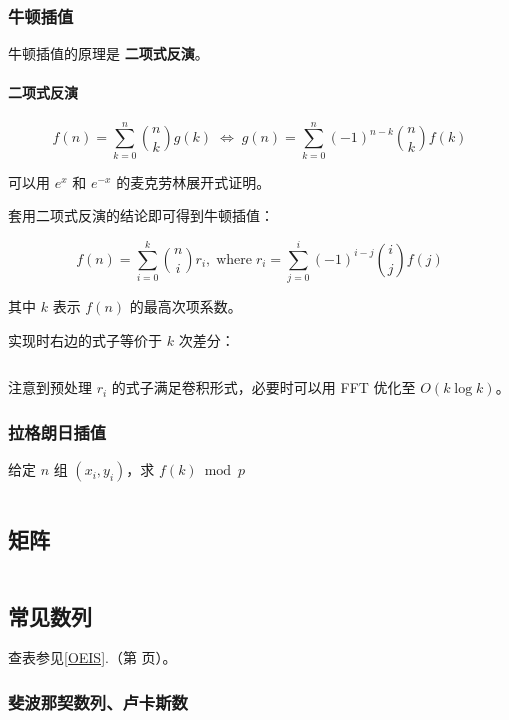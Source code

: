 \documentclass[a4paper, twoside]{article}
\newcommand\detailedref[1]{\ref{#1}.\nameref{#1}（第 \pageref{#1} 页）}
\begin{document}
        \subsubsection{牛顿插值}
        \label{NewtonInterpolation}
        牛顿插值的原理是 \textbf{二项式反演}。

        \paragraph{二项式反演}
        
            $$ f(n) = \sum_{k = 0} ^ n {n \choose k} g(k) \; \iff \; g(n) = \sum_{k = 0} ^ n \left( -1 \right) ^ {n - k} {n \choose k} f(k) $$
        
        可以用 $e^x$ 和 $e^{-x}$ 的麦克劳林展开式证明。
        
        套用二项式反演的结论即可得到牛顿插值：
        
            $$ f(n) = \sum_{i = 0} ^ k {n \choose i} r_i , \; \text{where} \; r_i = \sum_{j = 0} ^ i (-1) ^ {i - j} {i \choose j} f(j) $$
        
        其中 $k$ 表示 $f(n)$ 的最高次项系数。
        
        实现时右边的式子等价于 $k$ 次差分：
        
        \inputminted{cpp}{../src/数学/牛顿插值.cpp}
        
        注意到预处理 $r_i$ 的式子满足卷积形式，必要时可以用 FFT 优化至 $O(k\log k)$。

        \subsubsection{拉格朗日插值}
        给定 $n$ 组 $(x_i, y_i)$，求 $f(k) \bmod p$
        \inputminted{cpp}{../src/数学/拉格朗日插值.cpp}
    
    \subsection{矩阵}
    \inputminted{cpp}{../src/数学/矩阵.cpp}    

    \subsection{常见数列}
    查表参见\detailedref{OEIS}。
        \subsubsection{斐波那契数列、卢卡斯数}
\end{document}
